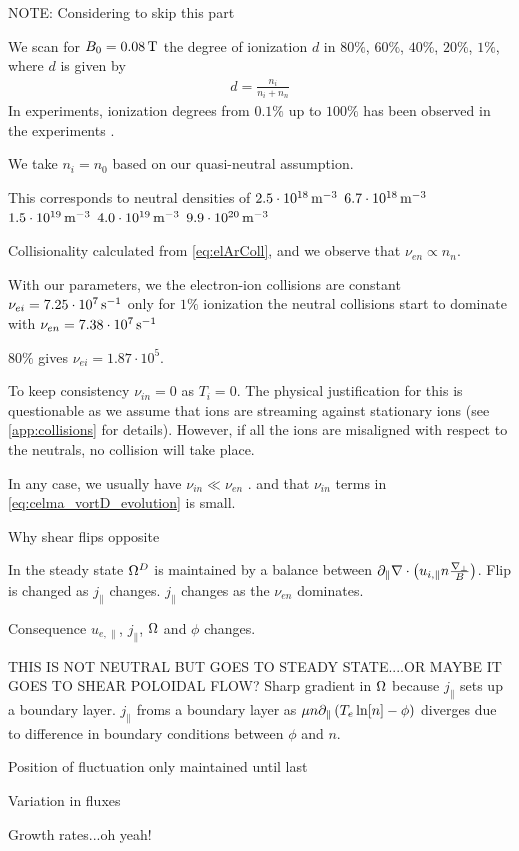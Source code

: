 NOTE: Considering to skip this part

We scan for $B_0=0.08\, \text{T}$ the degree of ionization $d$ in $80\%$, $60\%$, $40\%$, $20\%$, $1\%$, where $d$ is given by
%
\begin{align*}
    d = \frac{n_i}{n_i+n_n}
\end{align*}
%
In experiments, ionization degrees from $0.1\%$ up to $100\%$ has been observed in the experiments \cite{Schroder2003Phd}.

We take $n_i=n_0$ based on our quasi-neutral assumption.


This corresponds to neutral densities of
$2.5\cdot10^{18}\, \text{m}^{-3}$
$6.7\cdot10^{18}\, \text{m}^{-3}$
$1.5\cdot10^{19}\, \text{m}^{-3}$
$4.0\cdot10^{19}\, \text{m}^{-3}$
$9.9\cdot10^{20}\, \text{m}^{-3}$




Collisionality calculated from \cref{eq:elArColl}, and we observe that $\nu_{en}\propto n_n$.

With our parameters, we the electron-ion collisions are constant $\nu_{ei}=7.25\cdot10^7 \, \text{s}^{-1}$
only for $1\%$ ionization the neutral collisions start to dominate with $\nu_{en}=7.38\cdot10^7\, \text{s}^{-1}$

$80\%$ gives $\nu_{ei}=1.87\cdot10^{5}$.


To keep consistency $\nu_{in}=0$ as $T_i=0$.
The physical justification for this is questionable as we assume that ions are streaming against stationary ions (see \cref{app:collisions} for details).
However, if all the ions are misaligned with respect to the neutrals, no collision will take place.

In any case, we usually have $\nu_{in}\ll\nu_{en}$ \cite{Schroder2003Phd}.
and that $\nu_{in}$ terms in \cref{eq:celma_vortD_evolution} is small.


Why shear flips opposite


In the steady state $\Omega^D$ is maintained by a balance between $\partial_\|\nabla\cdot\left(u_{i,\|}n\frac{\nabla_\perp}{B}\right)$.
Flip is changed as $j_\|$ changes.
$j_\|$ changes as the $\nu_{en}$ dominates.

Consequence $u_{e,\|}$, $j_\|$, $\Omega$ and $\phi$ changes.





THIS IS NOT NEUTRAL BUT GOES TO STEADY STATE....OR MAYBE IT GOES TO SHEAR POLOIDAL FLOW?
Sharp gradient in $\Omega$ because $j_\|$ sets up a boundary layer.
$j_\|$ froms a boundary layer as $\mu n \partial_\|\left(T_e\ln[n]-\phi\right)$ diverges due to difference in boundary conditions between $\phi$ and $n$.


Position of fluctuation only maintained until last

Variation in fluxes


Growth rates...oh yeah!
